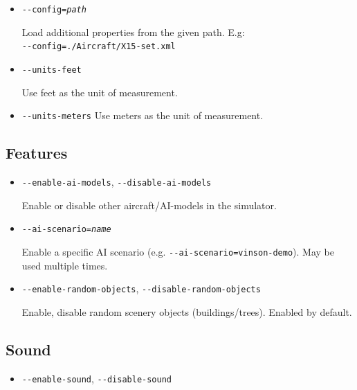 {\begin{itemize}
\item{\texttt{-$ $-config={\it path}}}

  Load additional properties from the given path. E.g:\\
  \texttt{-$ $-config=./Aircraft/X15-set.xml}

\item{\texttt{-$ $-units-feet}}

  Use feet as the unit of measurement.

\item{\texttt{-$ $-units-meters}}
  Use meters as the unit of measurement.
\end{itemize}
\subsection{Features}
\begin{itemize}

\item{\texttt{-$ $-enable-ai-models}, \texttt{-$ $-disable-ai-models}}

  Enable or disable other aircraft/AI-models in the simulator.

\item{\texttt{-$ $-ai-scenario={\it name}}}

  Enable a specific AI scenario (e.g. \texttt{-$ $-ai-scenario=vinson-demo}). May be used multiple times.

\item{\texttt{-$ $-enable-random-objects}, \texttt{-$ $-disable-random-objects}}

  Enable, disable random scenery objects (buildings/trees). Enabled by default.

\end{itemize}

\subsection{Sound}
\begin{itemize}
\item{\texttt{-$ $-enable-sound}, \texttt{-$ $-disable-sound}}


\end{itemize}}
